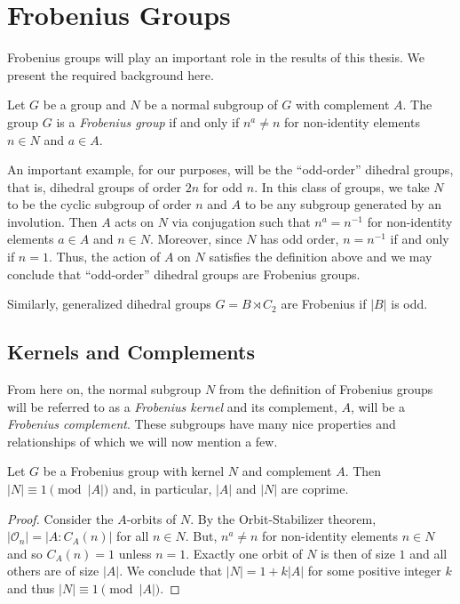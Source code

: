 \documentclass[main.tex]{subfiles}
\begin{document}
\chapter{Frobenius Groups}

Frobenius groups will play an important role in the results of this thesis. We present the required background here.

\hss

\begin{definition}
Let $G$ be a group and $N$ be a normal subgroup of $G$ with complement $A$. The group $G$ is a \emph{Frobenius group} if and only if $n^a \ne n$ for non-identity elements $n \in N$ and $a \in A$.
\end{definition}

\hss

An important example, for our purposes, will be the ``odd-order'' dihedral groups, that is, dihedral groups of order $2n$ for odd $n$. In this class of groups, we take $N$ to be the cyclic subgroup of order $n$ and $A$ to be any subgroup generated by an involution. Then $A$ acts on $N$ via conjugation such that $n^a = n^{-1}$ for non-identity elements $a \in A$ and $n \in N$. Moreover, since $N$ has odd order, $n = n^{-1}$ if and only if $n = 1$. Thus, the action of $A$ on $N$ satisfies the definition above and we may conclude that ``odd-order'' dihedral groups are Frobenius groups.

Similarly, generalized dihedral groups $G = B \rtimes C_2$ are Frobenius if $|B|$ is odd.

\hss

\section{Kernels and Complements}

\hss

From here on, the normal subgroup $N$ from the definition of Frobenius groups will be referred to as a \emph{Frobenius kernel} and its complement, $A$, will be a \emph{Frobenius complement}. These subgroups have many nice properties and relationships of which we will now mention a few.

\begin{lemma}\label{frobeniuscoprime}
Let $G$ be a Frobenius group with kernel $N$ and complement $A$. Then $|N| \equiv 1 \pmod{|A|}$ and, in particular, $|A|$ and $|N|$ are coprime.
\end{lemma}

\begin{proof}
Consider the $A$-orbits of $N$. By the Orbit-Stabilizer theorem, $|\mathcal{O}_n| = |A : C_A(n)|$ for all $n \in N$. But, $n^a \ne n$ for non-identity elements $n \in N$ and so $C_A(n) = 1$ unless $n = 1$. Exactly one orbit of $N$ is then of size $1$ and all others are of size $|A|$. We conclude that $|N| = 1 + k |A|$ for some positive integer $k$ and thus $|N| \equiv 1 \pmod{|A|}$.
\end{proof}
\end{document}
